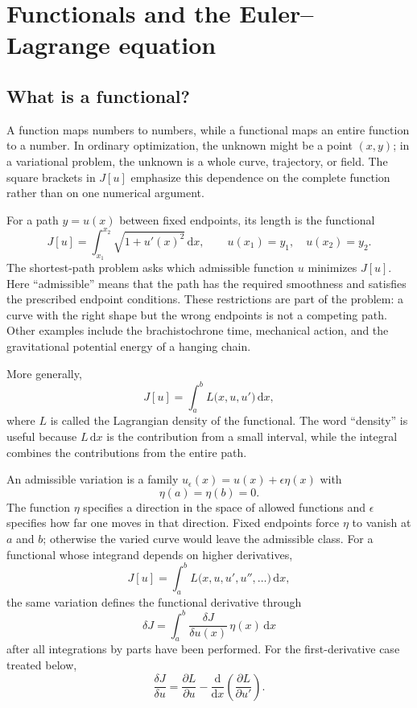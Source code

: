 \section{Functionals and the Euler--Lagrange equation}

\subsection{What is a functional?}
A function maps numbers to numbers, while a functional maps an entire function to a number. In ordinary optimization, the unknown might be a point $(x,y)$; in a variational problem, the unknown is a whole curve, trajectory, or field. The square brackets in $J[u]$ emphasize this dependence on the complete function rather than on one numerical argument.

For a path $y=u(x)$ between fixed endpoints, its length is the functional
\begin{equation}
J[u]=\int_{x_1}^{x_2}\sqrt{1+u'(x)^2}\,\mathrm{d}x,
\qquad
u(x_1)=y_1,\quad u(x_2)=y_2.
\end{equation}
The shortest-path problem asks which admissible function $u$ minimizes $J[u]$. Here ``admissible'' means that the path has the required smoothness and satisfies the prescribed endpoint conditions. These restrictions are part of the problem: a curve with the right shape but the wrong endpoints is not a competing path. Other examples include the brachistochrone time, mechanical action, and the gravitational potential energy of a hanging chain.

More generally,
\begin{equation}
J[u]=\int_a^b L\bigl(x,u,u'\bigr)\,\mathrm{d}x,
\end{equation}
where $L$ is called the Lagrangian density of the functional. The word ``density'' is useful because $L\,\mathrm{d}x$ is the contribution from a small interval, while the integral combines the contributions from the entire path.

An admissible variation is a family $u_\epsilon(x)=u(x)+\epsilon\eta(x)$ with
\begin{equation}
\eta(a)=\eta(b)=0.
\end{equation}
The function $\eta$ specifies a direction in the space of allowed functions and $\epsilon$ specifies how far one moves in that direction. Fixed endpoints force $\eta$ to vanish at $a$ and $b$; otherwise the varied curve would leave the admissible class. For a functional whose integrand depends on higher derivatives,
\begin{equation}
J[u]=\int_a^b L\bigl(x,u,u',u'',\ldots\bigr)\,\mathrm{d}x,
\end{equation}
the same variation defines the functional derivative through
\begin{equation}
\delta J=\int_a^b\frac{\delta J}{\delta u(x)}\,\eta(x)\,\mathrm{d}x
\end{equation}
after all integrations by parts have been performed. For the first-derivative case treated below,
\begin{equation}
\frac{\delta J}{\delta u}
=\frac{\partial L}{\partial u}
-\frac{\mathrm{d}}{\mathrm{d}x}\left(\frac{\partial L}{\partial u'}\right).
\end{equation}

